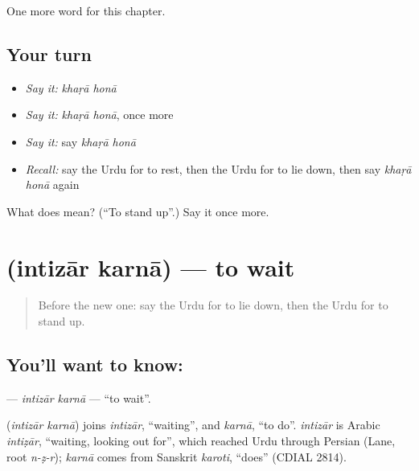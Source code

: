 \begin{grammarlens}[title={What you've built}]
One more word for this chapter.
\end{grammarlens}

\subsection*{Your turn}
\begin{itemize}
\raggedright
  \item \emph{Say it:} \emph{khaṛā honā}
  \item \emph{Say it:} \emph{khaṛā honā}, once more
  \item \emph{Say it:} say \emph{khaṛā honā}
  \item \emph{Recall:} say the Urdu for to rest, then the Urdu for to lie down, then say \emph{khaṛā honā} again
\end{itemize}

\begin{tcolorbox}[breakable,colback=teal!4,colframe=teal!35!black,title={Before you move on}]
What does   mean? (\textquotedblleft{}To stand up\textquotedblright{}.) Say it once more.
\end{tcolorbox}
\section[\texorpdfstring{\ur{انتظار} \ur{کرنا} (intizār karnā)}{انتظار کرنا (intizār karnā)}]{  (intizār karnā) — to wait}

\label{lesson:UR-C182-intizar-karna}



\begin{quote}
Before the new one: say the Urdu for to lie down, then the Urdu for to stand up.
\end{quote}

\subsection*{You'll want to know:  }
\textbf{ } — \emph{intizār karnā} — \textquotedblleft{}to wait\textquotedblright{}.

\begin{cousinweb}
\textbf{ } (\emph{intizār karnā}) joins \emph{intizār}, \textquotedblleft{}waiting\textquotedblright{}, and \emph{karnā}, \textquotedblleft{}to do\textquotedblright{}. \emph{intizār} is Arabic \emph{intiẓār}, \textquotedblleft{}waiting, looking out for\textquotedblright{}, which reached Urdu through Persian (Lane, root \emph{n-ẓ-r}); \emph{karnā} comes from Sanskrit \emph{karoti}, \textquotedblleft{}does\textquotedblright{} (CDIAL 2814).
\end{cousinweb}

